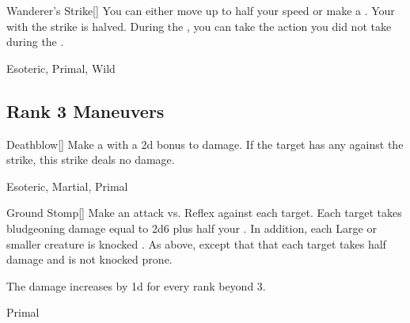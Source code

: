 \lowercase{\hypertarget{maneuver:Wanderer's Strike}{}}\label{maneuver:Wanderer's Strike}
\hypertarget{maneuver:Wanderer's Strike}{}
\begin{freeability}[Rank 2]{Wanderer's Strike}[]
You can either move up to half your speed or make a .
Your  with the strike is halved.
During the , you can take the action you did not take during the .


 Esoteric, Primal, Wild
\end{freeability}
\vspace{0.25em}


\subsection{Rank 3 Maneuvers}

\lowercase{\hypertarget{maneuver:Deathblow}{}}\label{maneuver:Deathblow}
\hypertarget{maneuver:Deathblow}{}
\begin{freeability}[Rank 3]{Deathblow}[]
Make a  with a \plus2d bonus to damage.
If the target has any  against the strike, this strike deals no damage.


 Esoteric, Martial, Primal
\end{freeability}
\vspace{0.25em}



\lowercase{\hypertarget{maneuver:Ground Stomp}{}}\label{maneuver:Ground Stomp}
\hypertarget{maneuver:Ground Stomp}{}
\begin{freeability}[Rank 3]{Ground Stomp}[]
Make an attack vs. Reflex against each target.
\hit Each target takes bludgeoning damage equal to 2d6 plus half your .
In addition, each Large or smaller creature is knocked .
\glance As above, except that that each target takes half damage and is not knocked prone.

\rankline
The damage increases by \plus1d for every rank beyond 3.


 Primal
\end{freeability}
\vspace{0.25em}



